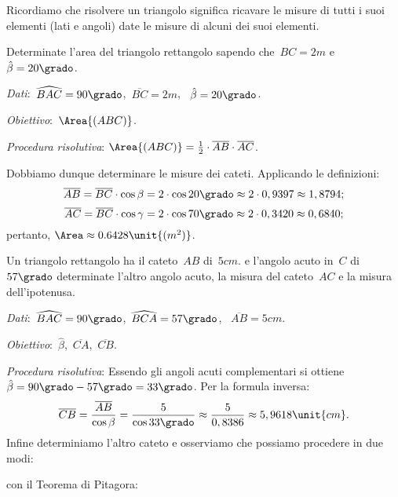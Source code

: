 Ricordiamo che risolvere un triangolo significa ricavare le misure di tutti i 
suoi elementi (lati e angoli) date le misure di alcuni dei suoi elementi.

\begin{exrig}
 \begin{esempio}
Determinate l'area del triangolo rettangolo sapendo che~${BC}=2\unit{m}$ 
e~$\hat{\beta} =20\grado$.

\emph{Dati}:~$\widehat{BAC}=90\grado$,\quad~$\overline{BC}=2\unit{m}$,
\quad~$\hat{\beta}=20\grado$.

\emph{Obiettivo}:~$\Area{(ABC)}$.

\emph{Procedura risolutiva}:
$\Area{(ABC)}=\frac{1}{2}\cdot \overline{AB}\cdot \overline{AC}$.

Dobbiamo dunque determinare le misure dei cateti. Applicando le definizioni:
\[\overline{AB}=\overline{BC}\cdot {\cos \beta}=2\cdot 
{\cos 20\grado} \approx2\cdot 0,9397\approx1,8794;\]
\[\overline{AC}=\overline{BC}\cdot {\cos \gamma}=2\cdot 
{\cos 70\grado} \approx2\cdot 0,3420\approx0,6840;\]
pertanto, $\Area\approx0.6428\unit{(m^{2})}$.
 \end{esempio}

 \begin{esempio}
Un triangolo rettangolo ha il cateto~$AB$ di~$5\unit{cm}$. e l'angolo acuto 
in~$C$ di~$57\grado$ determinate l'altro angolo acuto,
la misura del cateto~$AC$ e la misura dell'ipotenusa.

\emph{Dati}:~$\widehat{BAC}=90\grado$,\quad~$\widehat{BCA}=57\grado$,
\quad~$\overline{AB}=5\unit{cm}$.

\emph{Obiettivo}:~$\hat{\beta}$,\quad~$\overline{CA}$,\quad~$\overline{CB}$.

\emph{Procedura risolutiva}:
Essendo gli angoli acuti complementari si 
ottiene~$\hat{\beta}=90\grado-57\grado=33\grado$.
Per la formula inversa:
\[\overline{CB}=\frac{\overline{AB}}{\cos 
\beta}=\frac{5}{\cos 33\grado} \approx\frac{5}{0,8386}\approx5,9618\unit{cm}.\]
Infine determiniamo l'altro cateto e osserviamo che possiamo procedere in due 
modi:
\begin{itemize*}
 \item con il Teorema di Pitagora:
 

\end{itemize*}
\end{esempio}
\end{exrig}
